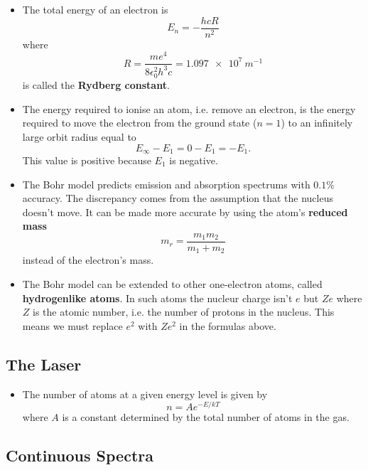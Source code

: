 \documentclass{article}
\begin{document}
\begin{itemize}
  \item The total energy of an electron is \[E_n = -\frac{h c R}{n^2}\] where \[R = \frac{m e^4}{8 \epsilon_0^2 h^3 c} = \qty{1.097e7}{m^{-1}}\] is called the \textbf{Rydberg constant}.

  \item The energy required to ionise an atom, i.e. remove an electron, is the energy required to move the electron from the ground state ($n = 1$) to an infinitely large orbit radius equal to \[E_\infty - E_1 = 0 - E_1 = -E_1.\] This value is positive because $E_1$ is negative.

  \item The Bohr model predicts emission and absorption spectrums with $0.1\%$ accuracy. The discrepancy comes from the assumption that the nucleus doesn't move. It can be made more accurate by using the atom's \textbf{reduced mass} \[m_r = \frac{m_1 m_2}{m_1 + m_2}\] instead of the electron's mass.

  \item The Bohr model can be extended to other one-electron atoms, called \textbf{hydrogenlike atoms}. In such atoms the nucleur charge isn't $e$ but $Z e$ where $Z$ is the atomic number, i.e. the number of protons in the nucleus. This means we must replace $e^2$ with $Z e^2$ in the formulas above.
\end{itemize}

\subsection{The Laser}

\begin{itemize}
  \item The number of atoms at a given energy level is given by \[n = A e^{-E / k T}\] where $A$ is a constant determined by the total number of atoms in the gas.
\end{itemize}

\subsection{Continuous Spectra}
\end{document}
